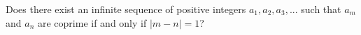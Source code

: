 Does there exist an infinite sequence of positive integers $a_1, a_2, a_3, . . .$  such that $a_m$ and $a_n$ are coprime if and only if $|m - n| = 1$?